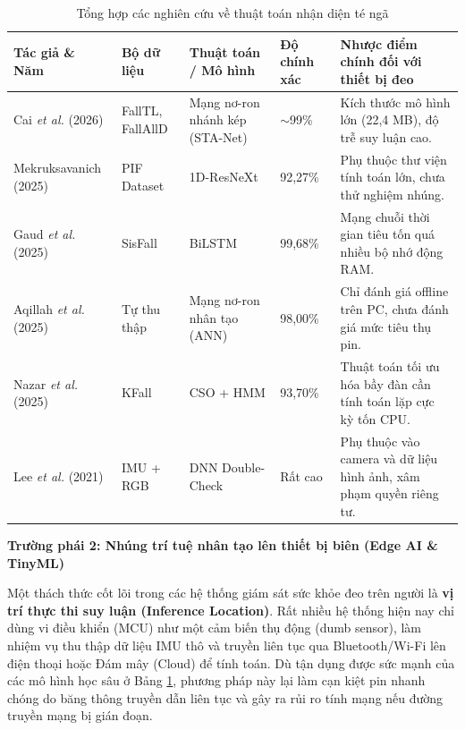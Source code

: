 \documentclass[../DoAn.tex]{subfiles}
\begin{document}
\begin{table}[H]
    \centering
    \caption{Tổng hợp các nghiên cứu về thuật toán nhận diện té ngã}
    \label{tab:survey_algorithm}
    \small
    \begin{tabular}{|p{2.8cm}|p{2.0cm}|p{3.5cm}|p{1.5cm}|p{3.9cm}|}
        \hline
        \textbf{Tác giả \& Năm} & \textbf{Bộ dữ liệu} & \textbf{Thuật toán / Mô hình} & \textbf{Độ chính xác} & \textbf{Nhược điểm chính đối với thiết bị đeo} \\
        \hline
        Cai \textit{et al.} (2026) \cite{cai2026stanet} & FallTL, FallAllD & Mạng nơ-ron nhánh kép (STA-Net) & $\sim$99\% & Kích thước mô hình lớn (22,4 MB), độ trễ suy luận cao. \\
        \hline
        Mekruksavanich (2025) \cite{mekruksavanich2024resnet} & PIF Dataset & 1D-ResNeXt & 92,27\% & Phụ thuộc thư viện tính toán lớn, chưa thử nghiệm nhúng. \\
        \hline
        Gaud \textit{et al.} (2025) \cite{gaud2025fibils} & SisFall & BiLSTM & 99,68\% & Mạng chuỗi thời gian tiêu tốn quá nhiều bộ nhớ động RAM. \\
        \hline
        Aqillah \textit{et al.} (2025) \cite{aqillah2024comparative} & Tự thu thập & Mạng nơ-ron nhân tạo (ANN) & 98,00\% & Chỉ đánh giá offline trên PC, chưa đánh giá mức tiêu thụ pin. \\
        \hline
        Nazar \textit{et al.} (2025) \cite{nazar2025csohm} & KFall & CSO + HMM & 93,70\% & Thuật toán tối ưu hóa bầy đàn cần tính toán lặp cực kỳ tốn CPU. \\
        \hline
        Lee \textit{et al.} (2021) \cite{lee2021deep} & IMU + RGB & DNN Double-Check & Rất cao & Phụ thuộc vào camera và dữ liệu hình ảnh, xâm phạm quyền riêng tư. \\
        \hline
    \end{tabular}
\end{table}

\textbf{Trường phái 2: Nhúng trí tuệ nhân tạo lên thiết bị biên (Edge AI \& TinyML)}

Một thách thức cốt lõi trong các hệ thống giám sát sức khỏe đeo trên người là \textbf{vị trí thực thi suy luận (Inference Location)}. Rất nhiều hệ thống hiện nay chỉ dùng vi điều khiển (MCU) như một cảm biến thụ động (dumb sensor), làm nhiệm vụ thu thập dữ liệu IMU thô và truyền liên tục qua Bluetooth/Wi-Fi lên điện thoại hoặc Đám mây (Cloud) để tính toán. Dù tận dụng được sức mạnh của các mô hình học sâu ở Bảng \ref{tab:survey_algorithm}, phương pháp này lại làm cạn kiệt pin nhanh chóng do băng thông truyền dẫn liên tục và gây ra rủi ro tính mạng nếu đường truyền mạng bị gián đoạn.
\end{document}
